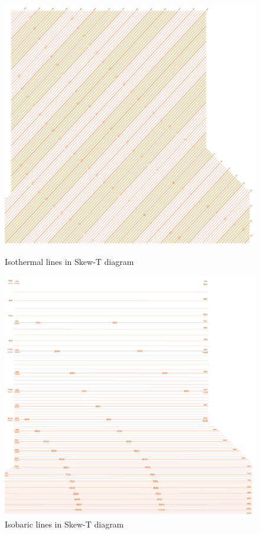 \documentclass[fleqn,10pt]{SelfArx} %
\begin{document}
\begin{figure}[ht]
    \centering
    \begin{minipage}[b]{0.48\textwidth}
        \centering
        \includegraphics[width=\textwidth]{Figures/Iso-thermal-lines.png}
        \caption{Isothermal lines in Skew-T diagram}
    \end{minipage}
    \hfill
    \begin{minipage}[b]{0.48\textwidth}
        \centering
        \includegraphics[width=\textwidth]{Figures/Iso-baric-lines.png}
        \caption{Isobaric lines in Skew-T diagram}
    \end{minipage}
\end{figure}
\end{document}

